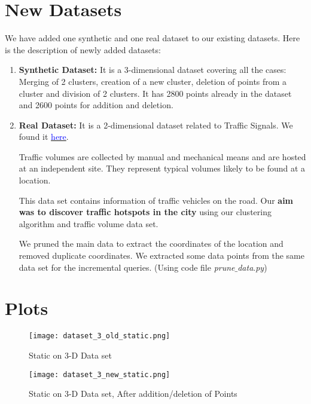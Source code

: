 \documentclass[acmsmall]{acmart}
\begin{document}
\section*{New Datasets}
We have added one synthetic and one real dataset to our existing datasets. Here is the description of newly added datasets:
\begin{enumerate}
    \item \textbf{Synthetic Dataset: }It is a 3-dimensional dataset covering all the cases: Merging of 2 clusters, creation of a new cluster, deletion of points from a cluster and division of 2 clusters. It has 2800 points already in the dataset and 2600 points for addition and deletion.
    \item \textbf{Real Dataset: }It is a 2-dimensional dataset related to Traffic Signals. We found it \href{https://data.world/buffalony/y93c-u65y/workspace/project-summary?agentid=buffalony&datasetid=y93c-u65y}{\textcolor{blue}{here}}.
    
    Traffic volumes are collected by manual and mechanical means and are hosted at an independent site. They represent typical volumes likely to be found at a location. 
    
    This data set contains information of traffic vehicles on the road. Our \textbf{aim was to discover traffic hotspots in the city} using our clustering algorithm and traffic volume data set.
    
    We pruned the main data to extract the coordinates of the location and removed duplicate coordinates. We extracted some data points from the same data set for the incremental queries. (Using code file \textit{prune$\_$data$.$py})

\end{enumerate}

\section*{Plots}

\begin{figure} [H]
    \texttt{[image: dataset\_3\_old\_static.png]}
    \caption{Static on 3-D Data set} 
\end{figure}
                    
\begin{figure} [H]
    \texttt{[image: dataset\_3\_new\_static.png]}
\caption{Static on 3-D Data set, After addition/deletion of Points} 
\end{figure}
            
\end{document}
